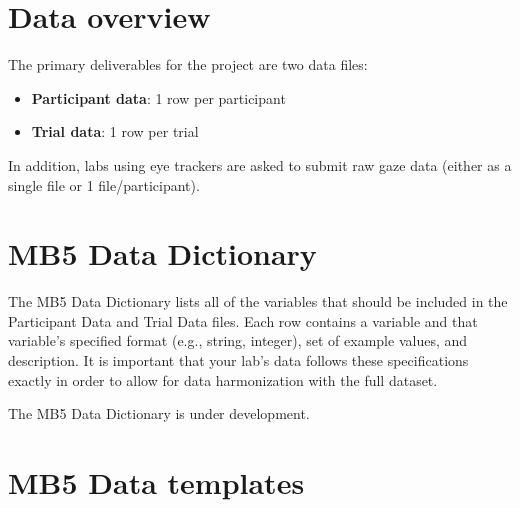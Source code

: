 \documentclass[
  letterpaper,
  DIV=11,
  numbers=noendperiod,
  oneside]{scrreprt}
\providecommand{\tightlist}{%
  \setlength{\itemsep}{0pt}\setlength{\parskip}{0pt}}
\begin{document}
\section{Data overview}\label{data-overview}

The primary deliverables for the project are two data files:

\begin{itemize}
\tightlist
\item
  \textbf{Participant data}: 1 row per participant
\item
  \textbf{Trial data}: 1 row per trial
\end{itemize}

In addition, labs using eye trackers are asked to submit raw gaze data
(either as a single file or 1 file/participant).

\section{MB5 Data Dictionary}\label{mb5-data-dictionary}

The MB5 Data Dictionary lists all of the variables that should be
included in the Participant Data and Trial Data files. Each row contains
a variable and that variable's specified format (e.g., string, integer),
set of example values, and description. It is important that your lab's
data follows these specifications exactly in order to allow for data
harmonization with the full dataset.

\begin{tcolorbox}[enhanced jigsaw, coltitle=black, colframe=quarto-callout-important-color-frame, titlerule=0mm, colback=white, arc=.35mm, toprule=.15mm, left=2mm, colbacktitle=quarto-callout-important-color!10!white, opacityback=0, bottomtitle=1mm, title=\textcolor{quarto-callout-important-color}{\faExclamation}\hspace{0.5em}{Important}, breakable, rightrule=.15mm, opacitybacktitle=0.6, toptitle=1mm, leftrule=.75mm, bottomrule=.15mm]

The MB5 Data Dictionary is under development.

\end{tcolorbox}

\section{MB5 Data templates}\label{mb5-data-templates}
\end{document}
